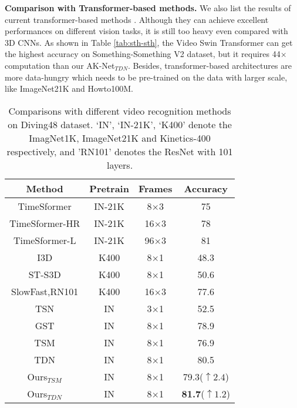 \documentclass[journal]{IEEEtran}
\begin{document}
\textbf{Comparison with Transformer-based methods.}
We also list the results of current transformer-based methods \cite{bertasius2021space, liu2021video}.
Although they can achieve excellent performances on different vision tasks, it is still too heavy even compared with 3D CNNs.
As shown in Table \ref{tab:sth-sth}, the Video Swin Transformer \cite{liu2021video} can get the highest accuracy on Something-Something V2 dataset, but it requires 44$\times$ computation than our AK-Net$_{TDN}$.
Besides, transformer-based architectures are more data-hungry which needs to be pre-trained on the data with larger scale, like ImageNet21K and Howto100M.

\begin{table}[ht]
    \centering
	\caption{Comparisons with different video recognition methods on Diving48 dataset. `IN', `IN-21K', `K400' denote the ImagNet1K, ImageNet21K and Kinetics-400 respectively, and 'RN101' denotes the ResNet with 101 layers.}
	\label{tab:diving48}
    \begin{tabular}{cccc} \hline
        Method              & Pretrain  & Frames & Accuracy  \\ \hline
        TimeSformer \cite{bertasius2021space}         & IN-21K    & 8$\times$3    & 75        \\ 
        TimeSformer-HR \cite{bertasius2021space}      & IN-21K    & 16$\times$3  & 78        \\ 
        TimeSformer-L \cite{bertasius2021space}       & IN-21K    & 96$\times$3   & 81        \\ 
        I3D  \cite{carreira2017quo} & K400      & 8$\times$1    & 48.3      \\
        ST-S3D  \cite{xie2018rethinking} & K400      & 8$\times$1    & 50.6      \\
        SlowFast,RN101 \cite{feichtenhofer2019slowfast}& K400      & 16$\times$3   & 77.6      \\
        TSN \cite{wang2016temporal} & IN        & 3$\times$1      & 52.5      \\
        GST \cite{luo2019grouped}              & IN        & 8$\times$1    & 78.9      \\
        TSM \cite{lin2019tsm} & IN        & 8$\times$1    & 76.9      \\
        TDN \cite{wang2021tdn} & IN        & 8$\times$1    & 80.5      \\ \hline
        Ours$_{TSM}$          & IN        & 8$\times$1    & 79.3($\uparrow 2.4$) \\
        Ours$_{TDN}$        & IN        & 8$\times$1    & \textbf{81.7}($\uparrow 1.2$) \\ \hline
    \end{tabular}
\end{table}
\end{document}
